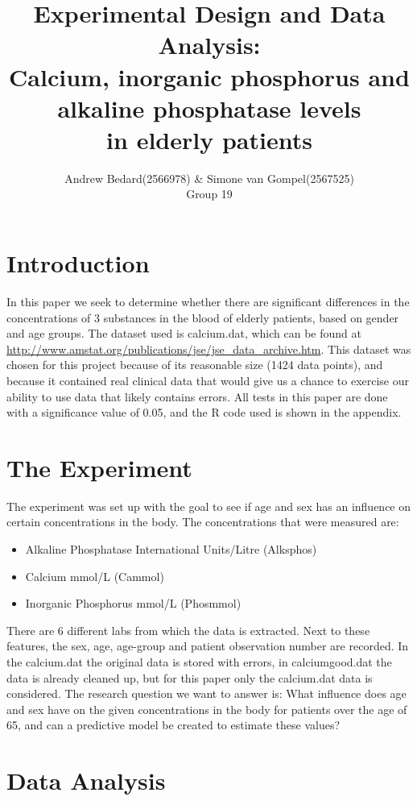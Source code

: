 \documentclass{article}
\title{Experimental Design and Data Analysis: \\ \large{Calcium, inorganic phosphorus and alkaline phosphatase levels\\ in elderly patients}}
\author{Andrew Bedard(2566978) \& Simone van Gompel(2567525) \\ Group 19}
\begin{document}
  \maketitle

  \section{Introduction}
  In this paper we seek to determine whether there are significant differences in the concentrations of 3 substances in the blood of elderly patients, based on gender and age groups.
    The dataset used is calcium.dat, which can be found at \url{http://www.amstat.org/publications/jse/jse_data_archive.htm}. This dataset was chosen for this project because of its reasonable size (1424 data points), and because it contained real clinical data that would give us a chance to exercise our ability to use data that likely contains errors. All tests in this paper are done with a significance value of 0.05, and the R code used is shown in the appendix.

  \section{The Experiment}
    The experiment was set up with the goal to see if age and sex has an influence on certain concentrations in the body.
    The concentrations that were measured are:
    \begin{itemize}
      \item Alkaline Phosphatase International Units/Litre (Alksphos)
      \item Calcium mmol/L (Cammol)
      \item Inorganic Phosphorus mmol/L (Phosmmol)
    \end{itemize}
    There are 6 different labs from which the data is extracted.
    Next to these features, the sex, age, age-group and patient observation number are recorded.
    In the calcium.dat the original data is stored with errors, in calciumgood.dat the data is already cleaned up, but for this paper only the calcium.dat data is considered.
    The research question we want to answer is: What influence does age and sex have on the given concentrations in the body for patients over the age of 65, and can a predictive model be created to estimate these values?

  \section{Data Analysis}
\end{document}
